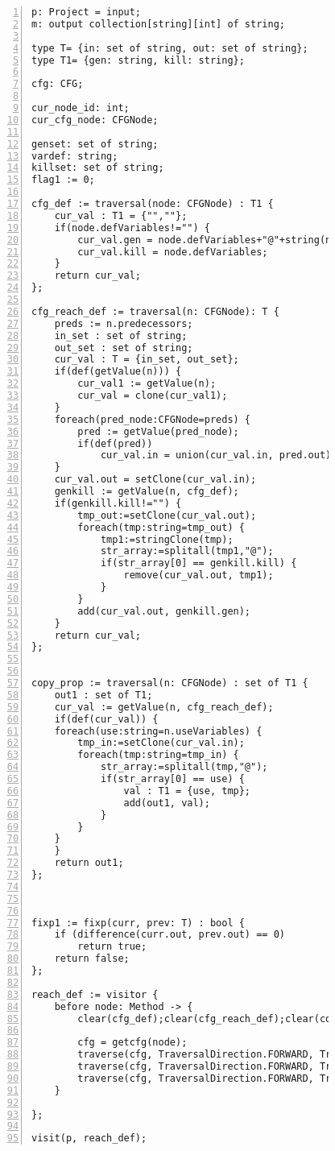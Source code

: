 \begin{figure}[ht!]
\begin{lstlisting}[numbers=left, tabsize=4, caption={Copy propagation},label={lst:cp-code}, lastline = 55] 
p: Project = input;
m: output collection[string][int] of string;

type T= {in: set of string, out: set of string};
type T1= {gen: string, kill: string};

cfg: CFG;

cur_node_id: int;
cur_cfg_node: CFGNode;

genset: set of string;
vardef: string;
killset: set of string;
flag1 := 0;

cfg_def := traversal(node: CFGNode) : T1 {
	cur_val : T1 = {"",""};
	if(node.defVariables!="") {
		cur_val.gen = node.defVariables+"@"+string(node.id);
		cur_val.kill = node.defVariables;
	}
	return cur_val;
};

cfg_reach_def := traversal(n: CFGNode): T {
	preds := n.predecessors;
	in_set : set of string;
	out_set : set of string;
	cur_val : T = {in_set, out_set};
	if(def(getValue(n))) {
		cur_val1 := getValue(n);
		cur_val = clone(cur_val1);
	}
	foreach(pred_node:CFGNode=preds) {	
		pred := getValue(pred_node);
		if(def(pred))
			cur_val.in = union(cur_val.in, pred.out);
	}
	cur_val.out = setClone(cur_val.in);
	genkill := getValue(n, cfg_def);
	if(genkill.kill!="") {
		tmp_out:=setClone(cur_val.out);
		foreach(tmp:string=tmp_out) {
			tmp1:=stringClone(tmp);
			str_array:=splitall(tmp1,"@");
			if(str_array[0] == genkill.kill) {
				remove(cur_val.out, tmp1);
			}
		}
		add(cur_val.out, genkill.gen);
	}
	return cur_val;
};


copy_prop := traversal(n: CFGNode) : set of T1 {
	out1 : set of T1;
	cur_val := getValue(n, cfg_reach_def);
	if(def(cur_val)) {
	foreach(use:string=n.useVariables) {
		tmp_in:=setClone(cur_val.in);
		foreach(tmp:string=tmp_in) {
			str_array:=splitall(tmp,"@");
			if(str_array[0] == use) {
				val : T1 = {use, tmp};
				add(out1, val);
			}
		}
	}
	}
	return out1;
};



fixp1 := fixp(curr, prev: T) : bool {
	if (difference(curr.out, prev.out) == 0)
		return true;	
	return false;
};

reach_def := visitor {
	before node: Method -> {
		clear(cfg_def);clear(cfg_reach_def);clear(copy_prop);

		cfg = getcfg(node);
		traverse(cfg, TraversalDirection.FORWARD, TraversalKind.HYBRID, cfg_def);
		traverse(cfg, TraversalDirection.FORWARD, TraversalKind.HYBRID, cfg_reach_def, fixp1);
		traverse(cfg, TraversalDirection.FORWARD, TraversalKind.HYBRID, copy_prop);
	}

};

visit(p, reach_def);
\end{lstlisting}
\end{figure}